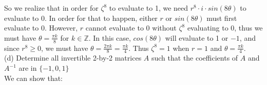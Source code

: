 \documentclass[20pt]{article}
\begin{document}
\begin{text}
    \noindent
    So we realize that in order for $\zeta^8$ to evaluate to 1, we need $r^{8} \cdot i \cdot sin(8\theta)$ to evaluate to 0. In order for that to happen, either $r$ or $sin(8\theta)$ must first evaluate to 0. However, $r$ cannot evaluate to 0 without $\zeta^8$ evaluating to 0, thus we must have $\theta = \frac{\pi k}{8}$ for $k \in \mathbb{Z}$. In this case, $cos(8\theta)$ will evaluate to 1 or $-1$, and since $r^8 \geq 0$, we must have $\theta = \frac{2\pi k}{8} = \frac {\pi k}{4}$. Thus $\zeta^8 = 1$ when $r = 1$ and $\theta = \frac {\pi k}{4}$.\\
    
    \noindent
    (d) Determine all invertible 2-by-2 matrices $A$ such that the coefficients of $A$ and $A^{−1}$ are in $\{-1, 0, 1\}$\\
    
    \noindent
    We can show that:
    

\end{text}
\end{document}
